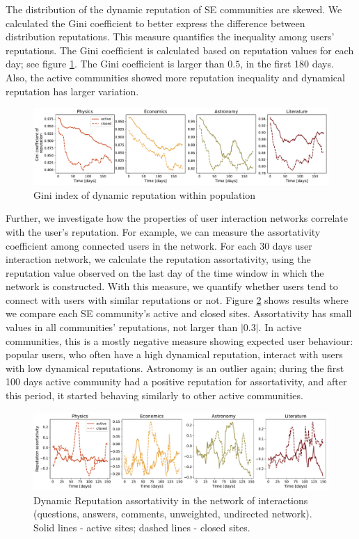 The distribution of the dynamic reputation of SE communities are skewed. We calculated the Gini coefficient to better express the difference between distribution reputations. This measure quantifies the inequality among users' reputations. The Gini coefficient is calculated based on reputation values for each day; see figure \ref{fig:dynrep-gini}. The Gini coefficient is larger than $0.5$, in the first 180 days. Also, the active communities showed more reputation inequality and dynamical reputation has larger variation. 

\begin{figure}[h]
	\centering
	\includegraphics[width=1\linewidth]{figures/stackexchange/gini.pdf}
	\caption{Gini index of dynamic reputation within population}
	\label{fig:dynrep-gini}
\end{figure} 

Further, we investigate how the properties of user interaction networks correlate with the user's reputation. For example, we can measure the assortativity coefficient among connected users in the network. For each 30 days user interaction network, we calculate the reputation assortativity, using the reputation value observed on the last day of the time window in which the network is constructed. With this measure, we quantify whether users tend to connect with users with similar reputations or not. Figure \ref{fig:dyn_rep_assort} shows results where we compare each SE community's active and closed sites. Assortativity has small values in all communities' reputations, not larger than $|0.3|$. In active communities, this is a mostly negative measure showing expected user behaviour: popular users, who often have a high dynamical reputation, interact with users with low dynamical reputations. Astronomy is an outlier again; during the first 100 days active community had a positive reputation for assortativity, and after this period, it started behaving similarly to other active communities. 

\begin{figure}[h]
	\centering
	\includegraphics[width=1\linewidth]{figures/stackexchange/reputation_assortativity.pdf}
	\caption{Dynamic Reputation assortativity in the network of interactions (questions, answers, comments, unweighted, undirected network). Solid lines - active sites; dashed lines - closed sites.}
	\label{fig:dyn_rep_assort}
\end{figure}

